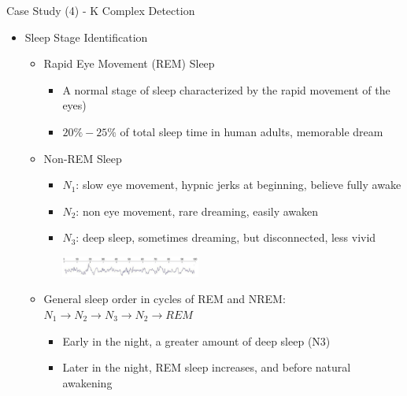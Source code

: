 \documentclass[
 size=14pt,
 paper=smartboard,  %
 mode=present, 		%
 display=slides, 	%
 style=tuliplab,  	%
 pauseslide,
 fleqn,leqno]{powerdot}{}
\begin{document}
\begin{slide}[toc=,bm=]{Case Study (4) - K Complex Detection}
\begin{itemize}
\item Sleep Stage Identification
\begin{itemize}
\item
\small{Rapid Eye Movement (REM) Sleep}
\begin{itemize}
\item
\small{A normal stage of sleep characterized by the rapid movement of the eyes)}
\item
\small{$20\%-25\%$ of total sleep time in human adults, memorable dream}
\end{itemize}
\item<2->
{Non-REM Sleep}
\begin{itemize}
\item<2->
\small{\textbf{$N_1$}: slow eye movement, hypnic jerks at beginning, believe fully awake}
\item<2->
\small{\textbf{$N_2$}: non eye movement, rare dreaming, easily awaken}
\item<2->
\small{\textbf{$N_3$}: deep sleep, sometimes dreaming, but disconnected, less vivid}
\begin{center}
  \includegraphics[width=0.4\textwidth]{figures//theme1//kcd.eps}
\end{center}
\end{itemize}

\item<3->
General sleep order in cycles of REM and NREM:
$N_1 \rightarrow N_2 \rightarrow N_3 \rightarrow N_2 \rightarrow REM$
\begin{itemize}
\item<3->
\small{Early in the night, a greater amount of deep sleep (N3)}
\item<3->
\small{Later in the night, REM sleep increases, and before natural awakening}
\end{itemize}
\end{itemize}
\end{itemize}


%
\footnotesize{}

\end{slide}
\end{document}
